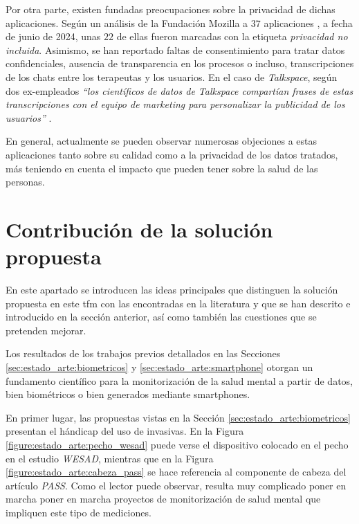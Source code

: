         Por otra parte, existen fundadas preocupaciones sobre la privacidad de dichas aplicaciones. Según un análisis de la Fundación Mozilla a $37$ aplicaciones \cite{mozilla_foundation_privacidad_nodate}, a fecha de junio de 2024, unas $22$ de ellas fueron marcadas con la etiqueta \textit{privacidad no incluida}. Asimismo, se han reportado faltas de consentimiento para tratar datos confidenciales, ausencia de transparencia en los procesos o incluso, transcripciones de los chats entre los terapeutas y los usuarios. En el caso de \textit{Talkspace}, según dos ex-empleados \textit{``los científicos de datos de Talkspace compartían frases de estas transcripciones con el equipo de marketing para personalizar la publicidad de los usuarios''} \cite{bejerano_lado_2023}.
        
        En general, actualmente se pueden observar numerosas objeciones a estas aplicaciones tanto sobre su calidad como a la privacidad de los datos tratados, más teniendo en cuenta el impacto que pueden tener sobre la salud de las personas.

\section{Contribución de la solución propuesta}

    En este apartado se introducen las ideas principales que distinguen la solución propuesta en este \gls{tfm} con las encontradas en la literatura y que se han descrito e introducido en la sección anterior, así como también las cuestiones que se pretenden mejorar.

    Los resultados de los trabajos previos detallados en las Secciones 
    \ref{sec:estado_arte:biometricos} y \ref{sec:estado_arte:smartphone} otorgan un fundamento científico para la monitorización de la salud mental a partir de datos, bien biométricos o bien generados mediante \glspl{smartphone}. 

    En primer lugar, las propuestas vistas en la Sección \ref{sec:estado_arte:biometricos} presentan el hándicap del uso de \glspl{invasiva}. En la Figura \ref{figure:estado_arte:pecho_wesad} puede verse el dispositivo colocado en el pecho en el estudio \textit{WESAD}, mientras que en la Figura  \ref{figure:estado_arte:cabeza_pass} se hace referencia al componente de cabeza del artículo \textit{PASS}. Como el lector puede observar, resulta muy complicado poner en marcha poner en marcha proyectos de monitorización de salud mental que impliquen este tipo de mediciones.

